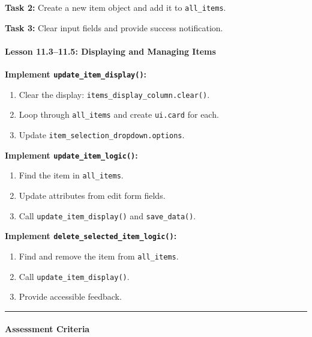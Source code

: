 \documentclass[
  justified,
  openright,
]{tufte-book}
\let\subsection\paragraph
\let\paragraph\paragraph
\let\subsection\paragraph
\let\paragraph\paragraph
\providecommand{\tightlist}{%
  \setlength{\itemsep}{0pt}\setlength{\parskip}{0pt}}
\begin{document}
\textbf{Task 2:} Create a new item object and add it to
\texttt{all\_items}.

\textbf{Task 3:} Clear input fields and provide success notification.

\subsection{Lesson 11.3--11.5: Displaying and Managing
Items}\label{lesson-11.311.5-displaying-and-managing-items}

\textbf{Implement \texttt{update\_item\_display()}:}

\begin{enumerate}
\def\labelenumi{\arabic{enumi}.}
\tightlist
\item
  Clear the display: \texttt{items\_display\_column.clear()}.
\item
  Loop through \texttt{all\_items} and create \texttt{ui.card} for each.
\item
  Update \texttt{item\_selection\_dropdown.options}.
\end{enumerate}

\textbf{Implement \texttt{update\_item\_logic()}:}

\begin{enumerate}
\def\labelenumi{\arabic{enumi}.}
\tightlist
\item
  Find the item in \texttt{all\_items}.
\item
  Update attributes from edit form fields.
\item
  Call \texttt{update\_item\_display()} and \texttt{save\_data()}.
\end{enumerate}

\textbf{Implement \texttt{delete\_selected\_item\_logic()}:}

\begin{enumerate}
\def\labelenumi{\arabic{enumi}.}
\tightlist
\item
  Find and remove the item from \texttt{all\_items}.
\item
  Call \texttt{update\_item\_display()}.
\item
  Provide accessible feedback.
\end{enumerate}

\begin{center}\rule{0.5\linewidth}{0.5pt}\end{center}

\subsection{Assessment Criteria}\label{assessment-criteria}
\end{document}
